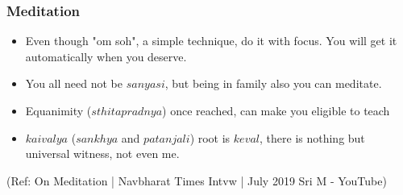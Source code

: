 \begin{frame}[fragile]\frametitle{Meditation}

	\begin{itemize}
	\item Even though "om soh", a simple technique, do it with focus. You will get it automatically when you deserve.
	\item You all need not be $sanyasi$, but being in family also you can meditate.
	\item Equanimity ($sthitapradnya$) once reached, can make you eligible to teach
	\item $kaivalya$ ($sankhya$ and $patanjali$) root is $keval$, there is nothing but universal witness, not even me.
	\end{itemize}

{\tiny (Ref: On Meditation | Navbharat Times Intvw | July 2019 Sri M - YouTube)}

\end{frame}
